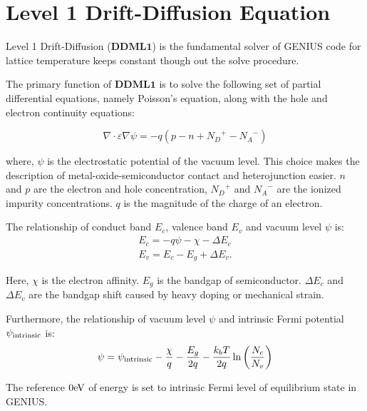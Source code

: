 \documentclass[oneside,12pt]{cgd_book}
\begin{document}
\section{Level 1 Drift-Diffusion Equation}
\label{sec:Equation:DDML1}
Level 1 Drift-Diffusion ($\mathbf{DDML1}$) is the fundamental solver of GENIUS code for lattice temperature keeps constant though out the solve
      procedure.
\par
The primary function of $\mathbf{DDML1}$ is to solve the following set of partial differential
      equations, namely Poisson's equation, along with the hole and electron continuity equations:
\par
{}
\begin{equation}
\nabla \cdot \varepsilon \nabla \psi = - q\left( p - n + {N_D}^+ - {N_A}^- \right)
\end{equation}
\par
\par
{}where, $\psi$ is the electrostatic potential of the vacuum level. This
      choice makes the description of metal-oxide-semiconductor contact and heterojunction easier.
$n$ and $p$ are the electron and hole concentration, ${N_D}^{+}$
and ${N_A}^{-}$ are the ionized impurity
      concentrations. $q$ is the magnitude of the charge of an electron.
\par
The relationship of conduct band $E_c$, valence band $E_v$ and vacuum level
$\psi$ is:
\begin{subequations}
\begin{align}
 E_c  =-q\psi-\chi-\Delta E_c \\
 E_v  =E_c-E_g+\Delta E_v.
\end{align}
\end{subequations}
\par
Here, $\chi$ is the electron affinity. $E_g$ is the
      bandgap of semiconductor. $\Delta E_c$ and $\Delta E_v$ are the bandgap shift caused by heavy doping or mechanical strain.
\par
Furthermore, the relationship of vacuum level $\psi$ and intrinsic Fermi
      potential $\psi_ {\rm intrinsic}$ is:
\begin{equation}
\psi = \psi _{\rm intrinsic} - \frac{\chi}{q} - \frac{E_g}{2q} - \frac{k_b T}{2q}\ln \left(
          \frac{N_c}{N_v} \right)
\end{equation}
\par
The reference $0\text{eV}$ of energy is set to intrinsic Fermi level of equilibrium
      state in GENIUS.
\end{document}
